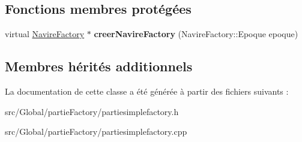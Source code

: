 \subsection*{Fonctions membres protégées}
\begin{DoxyCompactItemize}
\item 
virtual \hyperlink{class_navire_factory}{Navire\+Factory} $\ast$ {\bfseries creer\+Navire\+Factory} (Navire\+Factory\+::\+Epoque epoque)\hypertarget{class_partie_simple_factory_a3598a8b81b8738be235eaa47d1bd8a51}{}\label{class_partie_simple_factory_a3598a8b81b8738be235eaa47d1bd8a51}

\end{DoxyCompactItemize}
\subsection*{Membres hérités additionnels}


La documentation de cette classe a été générée à partir des fichiers suivants \+:\begin{DoxyCompactItemize}
\item 
src/\+Global/partie\+Factory/partiesimplefactory.\+h\item 
src/\+Global/partie\+Factory/partiesimplefactory.\+cpp\end{DoxyCompactItemize}
